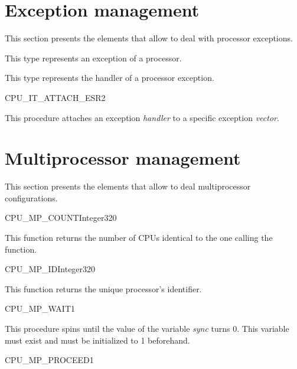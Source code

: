 \skipoff
\section {Exception management}
This section presents the elements that allow to deal with processor exceptions.
\skipon


This type represents an exception of a processor.


This type represents the handler of a processor exception.

\begin{procedure}{CPU\_IT\_ATTACH\_ESR}{2}
	\\
\end{procedure}

This procedure attaches an exception \emph{handler} to a specific
exception \emph{vector}.

\skipoff
\section {Multiprocessor management}
This section presents the elements that allow to deal multiprocessor
configurations.
\skipon

\begin{function}{CPU\_MP\_COUNT}{Integer32}{0}
\end{function}

This function returns the number of CPUs identical to the one calling
the function.

\begin{function}{CPU\_MP\_ID}{Integer32}{0}
\end{function}

This function returns the unique processor's identifier.

\begin{procedure}{CPU\_MP\_WAIT}{1}
\end{procedure}

This procedure spins until the value of the variable \emph{sync} turns 0.
This variable must exist and must be initialized to 1 beforehand.

\begin{procedure}{CPU\_MP\_PROCEED}{1}
\end{procedure}

